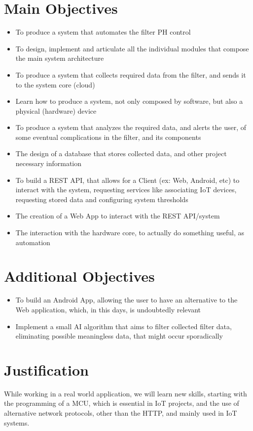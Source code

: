\documentclass[a4paper,twoside,11pt]{article}
\begin{document}
\section*{Main Objectives}
\begin{itemize}
    \item To produce a system that automates the filter PH control
    \item To design, implement and articulate all the individual modules that compose the main system architecture
    \item To produce a system that collects required data from the filter, and sends it to the system core (cloud)
    \item Learn how to produce a system, not only composed by software, but also a physical (hardware) device
    \item To produce a system that analyzes the required data, and alerts the user, of some eventual complications in the filter, and its components
    \item The design of a database that stores collected data, and other project necessary information
    \item To build a REST API, that allows for a Client (ex: Web, Android, etc) to interact with the system, requesting services like associating IoT devices, requesting stored data and configuring system thresholds
    \item The creation of a Web App to interact with the REST API/system
    \item The interaction with the hardware core, to actually do something useful, as automation
\end{itemize}

\section*{Additional Objectives}
\begin{itemize}
    \item To build an Android App, allowing the user to have an alternative to the Web application, which, in this days, is undoubtedly relevant
    \item Implement a small AI algorithm that aims to filter collected filter data, eliminating possible meaningless data, that might occur sporadically
\end{itemize}

\section*{Justification}
While working in a real world application, we will learn new skills, starting with the programming of a MCU, which is essential in IoT projects, and the use of alternative network protocols, other than the HTTP, and mainly used in IoT systems. 
\end{document}
